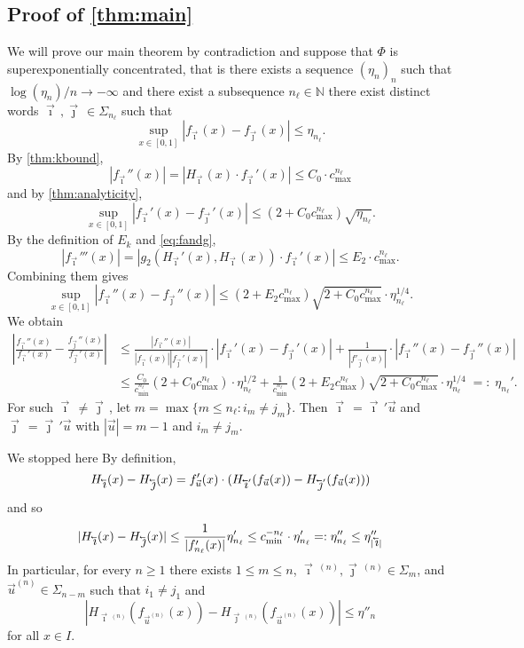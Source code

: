 \documentclass[12pt,]{article}
\theoremstyle{definition}
\theoremstyle{remark}
\renewcommand{\Bbb}[1]{\mathbb{#1}}
\newcommand{\bbN}{{\Bbb N}}         %
\newcommand{\0}{\mathbf{0}}
\newcommand{\cev}[1]{\reflectbox{\ensuremath{\vec{\reflectbox{\ensuremath{#1}}}}}}
\newcommand{\bi}{\vec{\imath}\,}
\newcommand{\bj}{\vec{\jmath}\,}
\newcommand{\bu}{{\vec{u}}}
\newcommand{\bbi}{\,\cev{\imath}}
\newcommand{\bbj}{\,\cev{\jmath}}
\begin{document}
\subsection{Proof of \texorpdfstring{\cref{thm:main}}{Main Theorem}}
We will prove our main theorem by contradiction and suppose that $\Phi$ is superexponentially
concentrated, that is there exists a sequence
$(\eta_n)_n$ such that $\log(\eta_n)/n\to-\infty$ and there exist a subsequence $n_{\ell}\in\bbN$ there exist distinct
words $\bi,\bj\in\Sigma_{n_\ell}$ such that
\[
  \sup_{x\in[0,1]}|f_{\bi}(x)-f_{\bj}(x)| \leq \eta_{n_\ell}.
\]
By \cref{thm:kbound},
\[
  |f_{\bi}''(x)| = |H_{\bi}(x)\cdot f_{\bi}'(x)|\leq C_0 \cdot c_{\max}^{n_\ell}
\]
and by \cref{thm:analyticity},
\[
  \sup_{x\in[0,1]}|f_{\bi}'(x) - f_{\bj}'(x)| \leq (2+C_0 c_{\max}^{n_\ell})\sqrt{\eta_{n_\ell}}.
\]
By the definition of $E_k$ and \cref{eq:fandg},
\[
  |f_{\bi}'''(x)| = |g_2(H_{\bi}'(x),H_{\bi}(x))\cdot f_{\bi}'(x)| \leq E_2\cdot c_{\max}^{n_\ell}.
\]
Combining them gives
\[
  \sup_{x\in[0,1]}|f_{\bi}''(x) - f_{\bj}''(x)| \leq (2+E_2c_{\max}^{n_\ell})\sqrt{2+C_0
  c_{\max}^{n_\ell}}\cdot
  \eta_{n_\ell}^{1/4}.
\]
We obtain
\begin{align*}
  \left|\frac{f_{\bi}''(x)}{f_{\bi}'(x)} - \frac{f_{\bj}''(x)}{f_{\bj}'(x)}\right|
    &\leq
    \frac{|f_{\bi}''(x)|}{|f_{\bi}(x)||f_{\bj}'(x)|}\cdot|f_{\bi}'(x) - f_{\bj}'(x)|
    +\frac{1}{|f'_{\bj}(x)|} \cdot |f_{\bi}''(x) - f_{\bj}''(x)|
    \\
    & 
    \leq \frac{C_0}{c_{\min}^{n_\ell}}(2+C_0c_{\max}^{n_\ell})\cdot \eta_{n_\ell}^{1/2}
    +\frac{1}{c_{\min}^{n_\ell}}(2+E_2
    c_{\max}^{n_\ell})\sqrt{2+C_0 c_{\max}^{n_\ell}} \cdot \eta_{n_\ell}^{1/4} \;=:\;\eta_{n_\ell}'.
\end{align*}
For such $\bi\neq\bj$, let $m = \max\{m\leq {n_\ell} : i_m \neq j_m\}$. Then $\bi = \bi'\bu$ and $\bj =
\bj'\bu$ with $|\bu| = m-1$ and $i_m\neq j_m$.

{\color{red}We stopped here}
By definition,
\[
  H_{\bbi}(x) - H_{\bbj}(x) = f_{\bu}'(x)\cdot (H_{\bbi'}(f_{\bu}(x)) - H_{\bbj'}(f_{\bu}(x)))
\]
and so
\[
  |H_{\bbi}(x) - H_{\bbj}(x)| \leq \frac{1}{|f'_{n_\ell}(x)|} \eta_{n_\ell}' \leq c_{\min}^{-{n_\ell}}
  \cdot \eta_{n_\ell}'
  =:\eta_{n_\ell}'' \leq \eta''_{|\bbi|}
\]
In particular, for every $n\geq 1$ there exists $1\leq m\leq n$, $\bi^{(n)},\bj^{(n)}\in\Sigma_m$,
and $\bu^{(n)}\in\Sigma_{n-m}$ such that $i_1 \neq j_1$ and
\[
  |H_{\bi^{(n)}}(f_{\bu^{(n)}}(x)) - H_{\bj^{(n)}}(f_{\bu^{(n)}}(x))| \leq \eta''_n
\]
for all $x\in I$.
\end{document}
